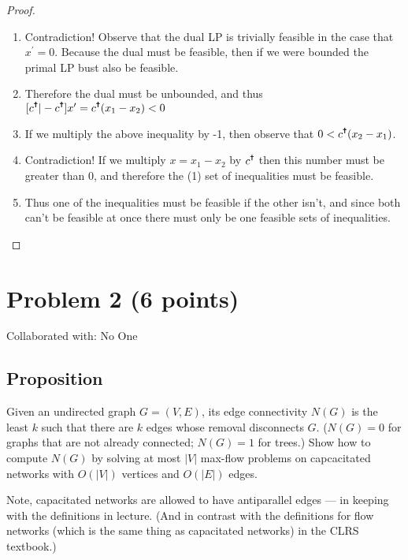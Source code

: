 \documentclass{article}
\begin{document}
\begin{proof}
\begin{enumerate}
            \item Contradiction! Observe that the dual LP is trivially feasible in the
            case that \(x^{\prime} = 0\). Because the dual must be feasible, then if we were bounded the primal LP
            bust also be feasible. 
            \item Therefore the dual must be unbounded, and thus \([c^{\text{\Cross{}}} |
            - c^{\text{\Cross{}}}] x^{\prime} = c^{\text{\Cross{}}}(x_1 - x_2) < 0\)
            \item If we multiply the above inequality by -1, then observe that \(0 <
            c^{\text{\Cross{}}}(x_2 - x_1)\).
            \item Contradiction! If we multiply \(x = x_1 - x_2\) by
            \(c^{\text{\Cross{}}}\) then this number must be greater than 0, and therefore
            the (1) set of inequalities must be feasible. 
            \item Thus one of the inequalities must be feasible if the other isn't, and
            since both can't be feasible at once there must only be one feasible sets of
            inequalities. 
      \end{enumerate}
\end{proof}


\newpage
\section{Problem 2 (6 points)}
Collaborated with: No One

\subsection{Proposition}
Given an undirected graph \(G = (V, E)\), its edge connectivity \(N(G)\) is the least
\(k\) such that there are \(k\) edges whose removal disconnects \(G\). (\(N(G) = 0\) for
graphs that are not already connected; \(N(G) = 1\) for trees.) Show how to compute
\(N(G)\) by solving at most \(|V|\) max-flow problems on capcacitated networks with
\(O(|V|)\) vertices and \(O(|E|)\) edges. 

Note, capacitated networks are allowed to have antiparallel edges --- in keeping with the
definitions in lecture. (And in contrast with the definitions for flow networks (which is
the same thing as capacitated networks) in the CLRS textbook.)
\end{document}
